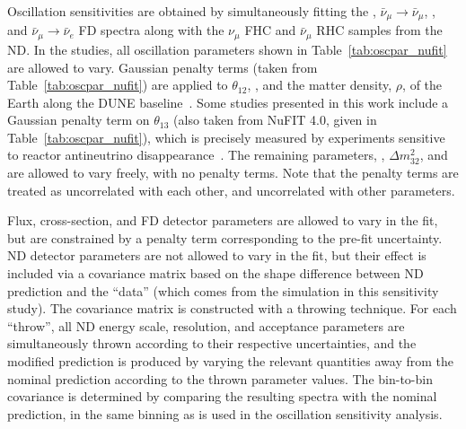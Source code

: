 Oscillation sensitivities are obtained by simultaneously fitting the \numutonumu, $\bar{\nu}_\mu \rightarrow \bar{\nu}_\mu$, \numutonue, and $\bar{\nu}_\mu \rightarrow \bar{\nu}_e$ FD spectra along with the $\nu_{\mu}$ FHC and $\bar{\nu}_{\mu}$ RHC samples from the ND. In the studies, all oscillation parameters shown in Table~\ref{tab:oscpar_nufit} are allowed to vary. Gaussian penalty terms (taken from Table~\ref{tab:oscpar_nufit}) are applied to $\theta_{12}$, , and the matter density, $\rho$, of the Earth along the DUNE baseline~\cite{Roe:2017zdw}. Some studies presented in this work include a Gaussian penalty term on $\theta_{13}$ (also taken from NuFIT 4.0, given in Table~\ref{tab:oscpar_nufit}), which is precisely measured by experiments sensitive to reactor antineutrino disappearance~\cite{Abrahao:2020ztg,Adey:2018zwh,Bak:2018ydk}. The remaining parameters, , $\Delta m^{2}_{32}$, and \deltacp are allowed to vary freely, with no penalty terms. Note that the penalty terms are treated as uncorrelated with each other, and uncorrelated with other parameters.

Flux, cross-section, and FD detector parameters are allowed to vary in the fit, but are constrained by a penalty term corresponding to the pre-fit uncertainty. ND detector parameters are not allowed to vary in the fit, but their effect is included via a covariance matrix based on the shape difference between ND prediction and the ``data'' (which comes from the simulation in this sensitivity study). The covariance matrix is constructed with a throwing technique. For each ``throw'', all ND energy scale, resolution, and acceptance parameters are simultaneously thrown according to their respective uncertainties, and the modified prediction is produced by varying the relevant quantities away from the nominal prediction according to the thrown parameter values. The bin-to-bin covariance is determined by comparing the resulting spectra with the nominal prediction, in the same binning as is used in the oscillation sensitivity analysis.

